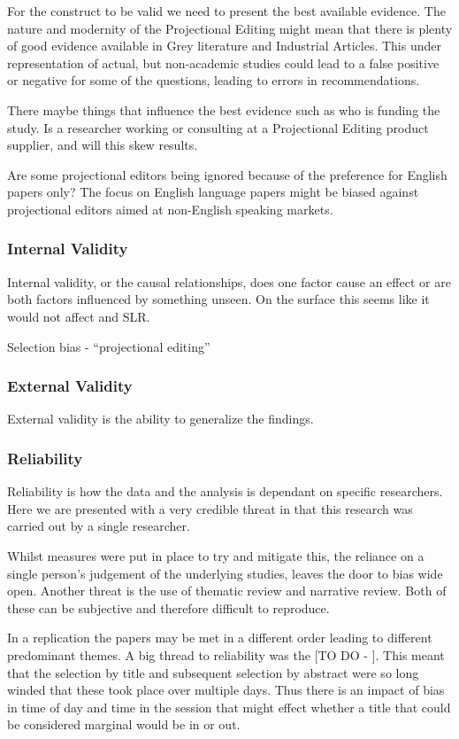 For the construct to be valid we need to present the best available evidence.
The nature and modernity of the Projectional Editing might mean that there is plenty of good evidence available in Grey literature and Industrial Articles. 
This under representation of actual, but non-academic studies could lead to a false positive or negative for some of the questions, leading to errors in recommendations.

There maybe things that influence the best evidence such as who is funding the study. 
Is a researcher working or consulting at a Projectional Editing product supplier, and will this skew results.

Are some projectional editors being ignored because of the preference for English papers only?
The focus on English language papers might be biased against projectional editors aimed at non-English speaking markets.


\subsubsection{Internal Validity}
Internal validity, or the causal relationships, does one factor cause an effect or are both factors influenced by something unseen.
On the surface this seems like it would not affect and SLR.


Selection bias - ``projectional editing''

\subsubsection{External Validity}
External validity is the ability to generalize the findings.

\subsubsection{Reliability}
Reliability is how the data and the analysis is dependant on specific researchers.
Here we are presented with a very credible threat in that this research was carried out by a single researcher.

Whilst measures were put in place to try and mitigate this, the reliance on a single person's judgement of the underlying studies, leaves the door to bias wide open.
Another threat is the use of thematic review and narrative review. 
Both of these can be subjective and therefore difficult to reproduce.

In a replication the papers may be met in a different order leading to different predominant themes. 
A big thread to reliability was the [TO DO - ].  
This meant that the selection by title and subsequent selection by abstract were so long winded that these took place over multiple days. 
Thus there is an impact of bias in time of day and time in the session that might effect whether a title that could be considered marginal would be in or out.


